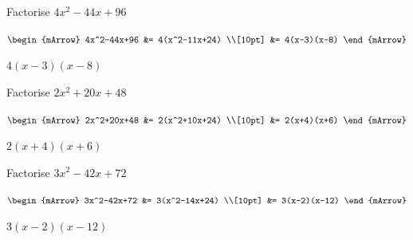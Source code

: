 \begin{mtask}
   \task \begin{exercise} Factorise $4x^2-44x+96$\\
             \begin{envSolution}
			      
			      $\begin{mArrow}
			         4x^2-44x+96  &= 4(x^2-11x+24)                      \\[10pt] 
                                  &= 4(x-3)(x-8)  					 
				 \end{mArrow}$
                 \begin{shortsolution}  
				       $4(x-3)(x-8)$
			     \end{shortsolution}				 
               \end{envSolution}
         \end{exercise}

   \task \begin{exercise} Factorise $2x^2+20x+48$\\
             \begin{envSolution}
			      
			      $\begin{mArrow}
			         2x^2+20x+48  &= 2(x^2+10x+24)                      \\[10pt] 
                                  &= 2(x+4)(x+6) 					 
				 \end{mArrow}$
                 \begin{shortsolution}  
				       $2(x+4)(x+6)$
			     \end{shortsolution}				 
               \end{envSolution}
         \end{exercise}


   \task \begin{exercise} Factorise $3x^2-42x+72$\\
             \begin{envSolution}
			      
			      $\begin{mArrow}
			        3x^2-42x+72  &= 3(x^2-14x+24)                      \\[10pt]   
                                 &= 3(x-2)(x-12)					
				 \end{mArrow}$
                 \begin{shortsolution}  
				       $3(x-2)(x-12)$
			     \end{shortsolution}				 
               \end{envSolution}
         \end{exercise}
		 


\end{mtask}
